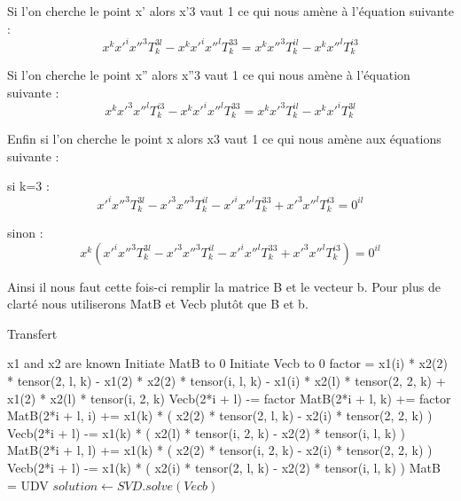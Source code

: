 \documentclass[a4paper,10pt]{report}
\begin{document}
Si l’on cherche le point x’ alors x’3 vaut 1 ce qui nous amène à l’équation suivante :
\[x^{k}x'^{i}x''^{3}T^{3l}_{k} - x^{k}x'^{i}x''^{l}T^{33}_{k} = x^{k}x''^{3}T^{il}_{k} - x^{k}x''^{l}T^{i3}_{k}\]

Si l’on cherche le point x” alors x”3 vaut 1 ce qui nous amène à l’équation suivante :
\[x^{k}x'^{3}x''^{l}T^{i3}_{k} - x^{k}x'^{i}x''^{l}T^{33}_{k} = x^{k}x'^{3}T^{il}_{k} - x^{k}x'^{i}T^{3l}_{k}\]

Enfin si l’on cherche le point x alors x3 vaut 1 ce qui nous amène aux équations suivante :

si k=3 :
\[x'^{i}x''^{3}T^{3l}_{k} - x'^{3}x''^{3}T^{il}_{k} - x'^{i}x''^{l}T^{33}_{k} + x'^{3}x''^{l}T^{i3}_{k} = 0^{il}\]

sinon :
\[x^{k}(x'^{i}x''^{3}T^{3l}_{k} - x'^{3}x''^{3}T^{il}_{k} - x'^{i}x''^{l}T^{33}_{k} + x'^{3}x''^{l}T^{i3}_{k}) = 0^{il}\]

Ainsi il nous faut cette fois-ci remplir la matrice B et le vecteur b. Pour plus de clarté nous utiliserons MatB et Vecb plutôt que B et b.

\begin{algorithm}
\caption{Transfert}
\begin{algorithmic}
\REQUIRE x1 and x2 are known
\STATE Initiate MatB to 0
\STATE Initiate Vecb to 0
\STATE factor = x1(i) * x2(2) * tensor(2, l, k) - x1(2) * x2(2) * tensor(i, l, k) - x1(i) * x2(l) * tensor(2, 2, k) + x1(2) * x2(l) * tensor(i, 2, k)
\STATE Vecb(2*i + l) -= factor
\ELSE
\STATE MatB(2*i + l, k) += factor
\ENDIF
{}
\STATE MatB(2*i + l, i) += x1(k) * ( x2(2) * tensor(2, l, k) - x2(i) * tensor(2, 2, k) )
\STATE Vecb(2*i + l) -= x1(k) * ( x2(l) * tensor(i, 2, k) - x2(2) * tensor(i, l, k) )
\STATE MatB(2*i + l, l) += x1(k) * ( x2(2) * tensor(i, 2, k) - x2(i) * tensor(2, 2, k) )
\STATE Vecb(2*i + l) -= x1(k) * ( x2(i) * tensor(2, l, k) - x2(2) * tensor(i, l, k) )
\ENDIF
\ENDFOR
\ENDFOR
\ENDFOR
\STATE MatB = UDV 
\STATE $solution \leftarrow SVD.solve(Vecb)$
\end{algorithmic}
\end{algorithm}
\end{document}
